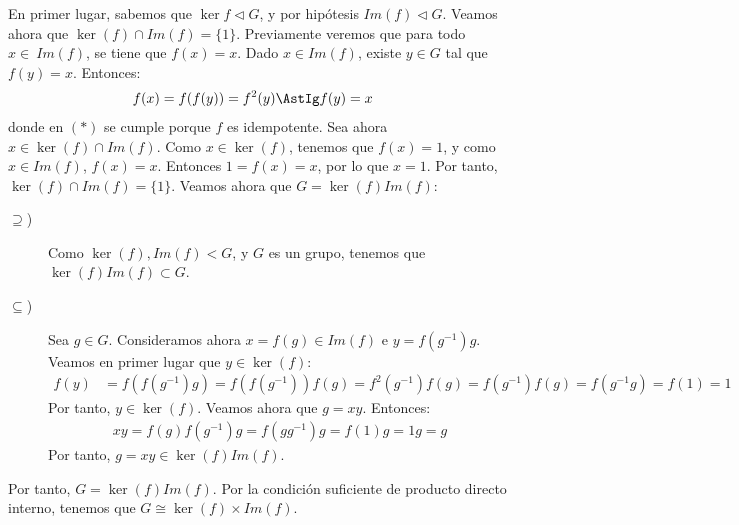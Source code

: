 \begin{ejercicio}
\begin{description}
        En primer lugar, sabemos que $\ker f \lhd G$, y por hipótesis $Im(f)\lhd G$. Veamos ahora que $\ker (f) \cap Im(f)=\{1\}$. Previamente veremos que para todo $x\in~Im(f)$, se tiene que $f(x)=x$. Dado $x\in Im(f)$, existe $y\in G$ tal que $f(y)=x$. Entonces:
        \begin{align*}
            f(x) &= f(f(y)) = f^2(y) \AstIg f(y) = x
        \end{align*}
        donde en $(\ast)$ se cumple porque $f$ es idempotente. Sea ahora $x\in \ker(f)\cap Im(f)$. Como $x\in \ker(f)$, tenemos que $f(x)=1$, y como $x\in Im(f)$, $f(x)=x$. Entonces $1=f(x)=x$, por lo que $x=1$. Por tanto, $\ker(f)\cap Im(f)=\{1\}$.
        Veamos ahora que $G=\ker(f)Im(f)$:
        \begin{description}
            \item[$\supseteq$)] Como $\ker(f),Im(f)<G$, y $G$ es un grupo, tenemos que $\ker(f)Im(f)\subset G$.
            \item[$\subseteq$)] Sea $g\in G$. Consideramos ahora $x=f(g)\in Im(f)$ e $y=f(g^{-1})g$. Veamos en primer lugar que $y\in \ker(f)$:
            \begin{align*}
                f(y) &= f(f(g^{-1})g) = f(f(g^{-1}))f(g) = f^2(g^{-1})f(g)
                = f(g^{-1})f(g) = f(g^{-1}g) = f(1) = 1
            \end{align*}
            Por tanto, $y\in \ker(f)$. Veamos ahora que $g=xy$. Entonces:
            \begin{align*}
                xy = f(g)f(g^{-1})g = f(gg^{-1})g = f(1)g = 1g = g
            \end{align*}
            Por tanto, $g=xy\in \ker(f)Im(f)$.
        \end{description}

        Por tanto, $G=\ker(f)Im(f)$. Por la condición suficiente de producto directo interno, tenemos que $G\cong \ker(f)\times Im(f)$.
        

    \end{description}
\end{ejercicio}

